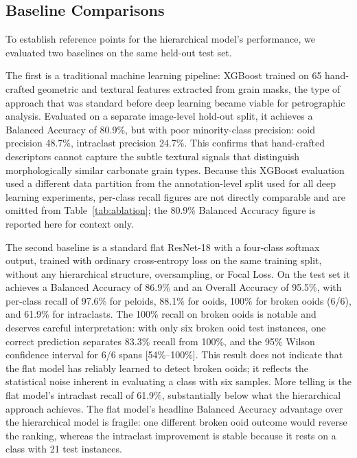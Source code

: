 \documentclass[a4paper,fleqn]{cas-dc}
\begin{document}
\subsection{Baseline Comparisons}
To establish reference points for the hierarchical model's performance, we evaluated two baselines on the same held-out test set.

The first is a traditional machine learning pipeline: XGBoost \citep{chen2016xgboost} trained on 65 hand-crafted geometric and textural features extracted from grain masks, the type of approach that was standard before deep learning became viable for petrographic analysis. Evaluated on a separate image-level hold-out split, it achieves a Balanced Accuracy of 80.9\%, but with poor minority-class precision: ooid precision 48.7\%, intraclast precision 24.7\%. This confirms that hand-crafted descriptors cannot capture the subtle textural signals that distinguish morphologically similar carbonate grain types. Because this XGBoost evaluation used a different data partition from the annotation-level split used for all deep learning experiments, per-class recall figures are not directly comparable and are omitted from Table~\ref{tab:ablation}; the 80.9\% Balanced Accuracy figure is reported here for context only.

The second baseline is a standard flat ResNet-18 with a four-class softmax output, trained with ordinary cross-entropy loss on the same training split, without any hierarchical structure, oversampling, or Focal Loss. On the test set it achieves a Balanced Accuracy of 86.9\% and an Overall Accuracy of 95.5\%, with per-class recall of 97.6\% for peloids, 88.1\% for ooids, 100\% for broken ooids (6/6), and 61.9\% for intraclasts. The 100\% recall on broken ooids is notable and deserves careful interpretation: with only six broken ooid test instances, one correct prediction separates 83.3\% recall from 100\%, and the 95\% Wilson confidence interval for 6/6 spans [54\%--100\%]. This result does not indicate that the flat model has reliably learned to detect broken ooids; it reflects the statistical noise inherent in evaluating a class with six samples. More telling is the flat model's intraclast recall of 61.9\%, substantially below what the hierarchical approach achieves. The flat model's headline Balanced Accuracy advantage over the hierarchical model is fragile: one different broken ooid outcome would reverse the ranking, whereas the intraclast improvement is stable because it rests on a class with 21 test instances.
\end{document}
